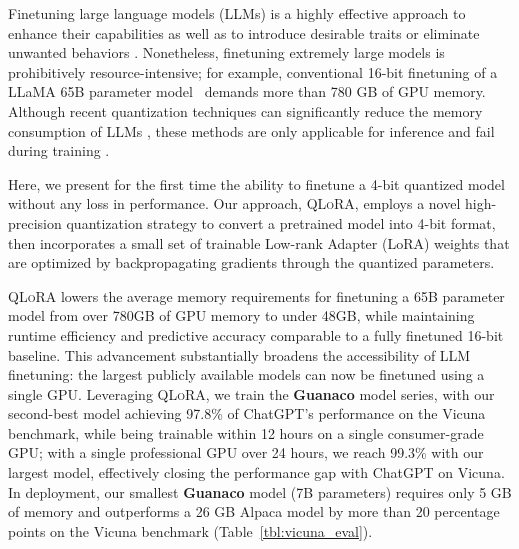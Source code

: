 Finetuning large language models (LLMs) is a highly effective approach to enhance their capabilities \citep{min2021metaicl, wei2021finetuned, ouyang2022training, wang2022super, wang2022self, liu2022few} as well as to introduce desirable traits or eliminate unwanted behaviors \citep{ouyang2022training,askell2021general,bai2022training}. Nonetheless, finetuning extremely large models is prohibitively resource-intensive; for example, conventional 16-bit finetuning of a LLaMA 65B parameter model~\citep{touvron2023llama} demands more than 780 GB of GPU memory. Although recent quantization techniques can significantly reduce the memory consumption of LLMs \citep{dettmers2022llm, dettmers2022case, frantar2022gptq, xiao2022smoothquant}, these methods are only applicable for inference and fail during training \citep{wortsman2023stable}.

Here, we present for the first time the ability to finetune a 4-bit quantized model without any loss in performance. Our approach, \textsc{QLoRA}, employs a novel high-precision quantization strategy to convert a pretrained model into 4-bit format, then incorporates a small set of trainable Low-rank Adapter (LoRA) weights \citep{hu2021lora} that are optimized by backpropagating gradients through the quantized parameters.

\textsc{QLoRA} lowers the average memory requirements for finetuning a 65B parameter model from over 780GB of GPU memory to under 48GB, while maintaining runtime efficiency and predictive accuracy comparable to a fully finetuned 16-bit baseline. This advancement substantially broadens the accessibility of LLM finetuning: the largest publicly available models can now be finetuned using a single GPU. Leveraging \textsc{QLoRA}, we train the \textbf{Guanaco} model series, with our second-best model achieving 97.8\% of ChatGPT's performance on the Vicuna~\citep{vicuna2023} benchmark, while being trainable within 12 hours on a single consumer-grade GPU; with a single professional GPU over 24 hours, we reach 99.3\% with our largest model, effectively closing the performance gap with ChatGPT on Vicuna. In deployment, our smallest \textbf{Guanaco} model (7B parameters) requires only 5 GB of memory and outperforms a 26 GB Alpaca model by more than 20 percentage points on the Vicuna benchmark (Table~\ref{tbl:vicuna_eval}).

